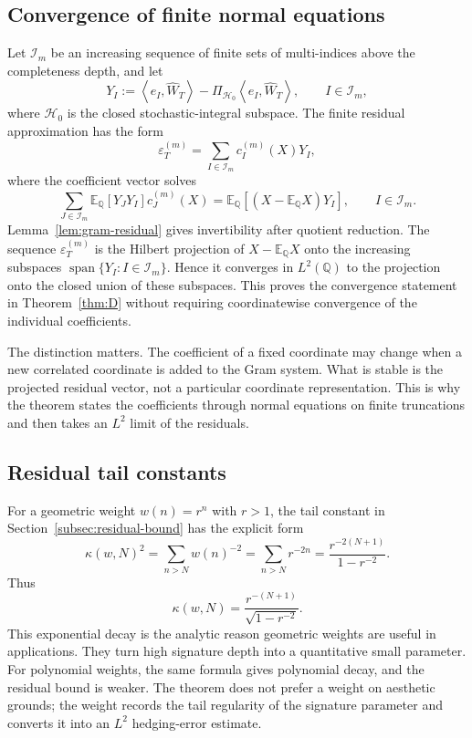 \documentclass[11pt,oneside]{article}
\theoremstyle{plain}
\theoremstyle{definition}
\theoremstyle{remark}
\newcommand{\E}{\mathbb{E}}
\newcommand{\Q}{\mathbb{Q}}
\newcommand{\cW}{\widehat W}
\newcommand{\inner}[2]{\left\langle #1,#2\right\rangle}
\newcommand{\Span}{\operatorname{span}}
\begin{document}
\subsection{Convergence of finite normal equations}
\label{subsec:finite-normal-equations-converge}
Let $\mathcal I_m$ be an increasing sequence of finite sets of multi-indices above the completeness depth, and let
\[
Y_I:=\inner{e_I}{\cW_T}-\Pi_{\mathcal H_0}\inner{e_I}{\cW_T},
\qquad I\in\mathcal I_m,
\]
where $\mathcal H_0$ is the closed stochastic-integral subspace. The finite residual approximation has the form
\[
\varepsilon_T^{(m)}=\sum_{I\in\mathcal I_m} c_I^{(m)}(X)Y_I,
\]
where the coefficient vector solves
\[
\sum_{J\in\mathcal I_m}\E_\Q[Y_JY_I]c_J^{(m)}(X)
=\E_\Q[(X-\E_\Q X)Y_I],
\qquad I\in\mathcal I_m .
\]
Lemma~\ref{lem:gram-residual} gives invertibility after quotient reduction. The sequence $\varepsilon_T^{(m)}$ is the Hilbert projection of $X-\E_\Q X$ onto the increasing subspaces $\Span\{Y_I:I\in\mathcal I_m\}$. Hence it converges in $L^2(\Q)$ to the projection onto the closed union of these subspaces. This proves the convergence statement in Theorem~\ref{thm:D} without requiring coordinatewise convergence of the individual coefficients.

The distinction matters. The coefficient of a fixed coordinate may change when a new correlated coordinate is added to the Gram system. What is stable is the projected residual vector, not a particular coordinate representation. This is why the theorem states the coefficients through normal equations on finite truncations and then takes an $L^2$ limit of the residuals.

\subsection{Residual tail constants}
\label{subsec:residual-tail-constants-expanded}
For a geometric weight $w(n)=r^n$ with $r>1$, the tail constant in Section~\ref{subsec:residual-bound} has the explicit form
\[
\kappa(w,N)^2=\sum_{n>N}w(n)^{-2}
=\sum_{n>N}r^{-2n}
=\frac{r^{-2(N+1)}}{1-r^{-2}} .
\]
Thus
\[
\kappa(w,N)=\frac{r^{-(N+1)}}{\sqrt{1-r^{-2}}} .
\]
This exponential decay is the analytic reason geometric weights are useful in applications. They turn high signature depth into a quantitative small parameter. For polynomial weights, the same formula gives polynomial decay, and the residual bound is weaker. The theorem does not prefer a weight on aesthetic grounds; the weight records the tail regularity of the signature parameter and converts it into an $L^2$ hedging-error estimate.
\end{document}
